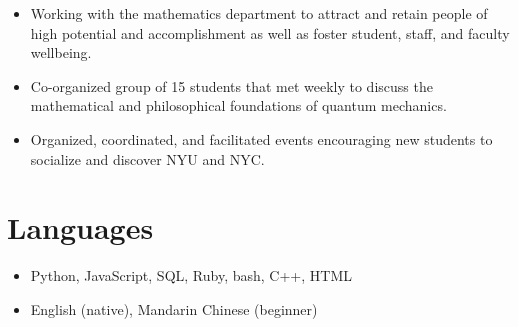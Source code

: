 \documentclass{cultvoucher}
\begin{document}
\begin{itemize}
	\item Working with the mathematics department to attract and retain people of high potential and accomplishment as well as foster student, staff, and faculty wellbeing.
\end{itemize}

\begin{itemize}
	\item Co-organized group of 15 students that met weekly to discuss the mathematical and philosophical foundations of quantum mechanics.
\end{itemize}

\begin{itemize}
	\item Organized, coordinated, and facilitated events encouraging new students to socialize and discover NYU and NYC.
\end{itemize}

\section{Languages}
\begin{itemize}
	\item Python, JavaScript, SQL, Ruby, bash, C++, HTML
	\item English (native), Mandarin Chinese (beginner)
\end{itemize}
\end{document}
